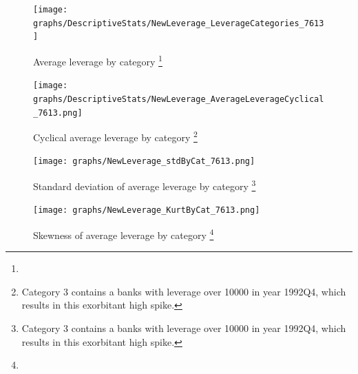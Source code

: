 \documentclass[12pt, a4paper]{article} %
\begin{document}

\begin{figure}[hbtp]
\begin{minipage}{\textwidth}
\centering
\caption[1]{Average leverage by category \footnote{}}
\texttt{[image: graphs/DescriptiveStats/NewLeverage\_LeverageCategories\_7613]}
\label{fig:averageLeverage_Categories}
\end{minipage}
\end{figure}

\begin{figure}[hbtp]
\begin{minipage}{\textwidth}
\centering
\caption[1]{Cyclical average leverage by category \footnote{Category 3 contains a banks with leverage over 10000 in year 1992Q4, which results in this exorbitant high spike.}}
\texttt{[image: graphs/DescriptiveStats/NewLeverage\_AverageLeverageCyclical\_7613.png]}
\label{fig:averageLeverage_cyclical_Categories}
\end{minipage}
\end{figure}

\begin{figure}[hbtp]
\begin{minipage}{\textwidth}
\centering
\caption[1]{Standard deviation of average leverage by category \footnote{Category 3 contains a banks with leverage over 10000 in year 1992Q4, which results in this exorbitant high spike.}}
\texttt{[image: graphs/NewLeverage\_stdByCat\_7613.png]}
\label{fig:averageLeverage_cyclicalStd_Categories}
\end{minipage}
\end{figure}


\begin{figure}[hbtp]
\begin{minipage}{\textwidth}
\centering
\caption[1]{Skewness of average leverage by category \footnote{}}
\texttt{[image: graphs/NewLeverage\_KurtByCat\_7613.png]}
\label{fig:averageLeverage_kurt_Categories}
\end{minipage}
\end{figure}
\end{document}
